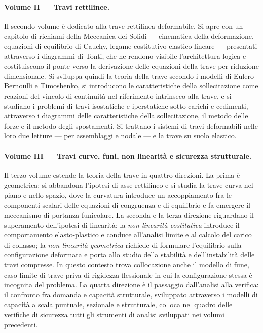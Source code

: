 \paragraph{Volume II --- Travi rettilinee.}
Il secondo volume è dedicato alla trave rettilinea deformabile. Si apre con un capitolo di richiami della Meccanica dei Solidi --- cinematica della deformazione, equazioni di equilibrio di Cauchy, legame costitutivo elastico lineare --- presentati attraverso i diagrammi di Tonti, che ne rendono visibile l'architettura logica e costituiscono il ponte verso la derivazione delle equazioni della trave per riduzione dimensionale. Si sviluppa quindi la teoria della trave secondo i modelli di Eulero-Bernoulli e Timoshenko, si introducono le caratteristiche della sollecitazione come reazioni del vincolo di continuità nel riferimento intrinseco alla trave, e si studiano i problemi di travi isostatiche e iperstatiche sotto carichi e cedimenti, attraverso i diagrammi delle caratteristiche della sollecitazione, il metodo delle forze e il metodo degli spostamenti. Si trattano i sistemi di travi deformabili nelle loro due letture --- per assemblaggi e nodale --- e la trave su suolo elastico.

\paragraph{Volume III --- Travi curve, funi, non linearità e sicurezza strutturale.}
Il terzo volume estende la teoria della trave in quattro direzioni. La prima è geometrica: si abbandona l'ipotesi di asse rettilineo e si studia la trave curva nel piano e nello spazio, dove la curvatura introduce un accoppiamento fra le componenti scalari delle equazioni di congruenza e di equilibrio e fa emergere il meccanismo di portanza funicolare. La seconda e la terza direzione riguardano il superamento dell'ipotesi di linearità: la \textit{non linearità costitutiva} introduce il comportamento elasto-plastico e conduce all'analisi limite e al calcolo del carico di collasso; la \textit{non linearità geometrica} richiede di formulare l'equilibrio sulla configurazione deformata e porta allo studio della stabilità e dell'instabilità delle travi compresse. In questo contesto trova collocazione anche il modello di fune, caso limite di trave priva di rigidezza flessionale in cui la configurazione stessa è incognita del problema. La quarta direzione è il passaggio dall'analisi alla verifica: il confronto fra domanda e capacità strutturale, sviluppato attraverso i modelli di capacità a scala puntuale, sezionale e strutturale, colloca nel quadro delle verifiche di sicurezza tutti gli strumenti di analisi sviluppati nei volumi precedenti.
